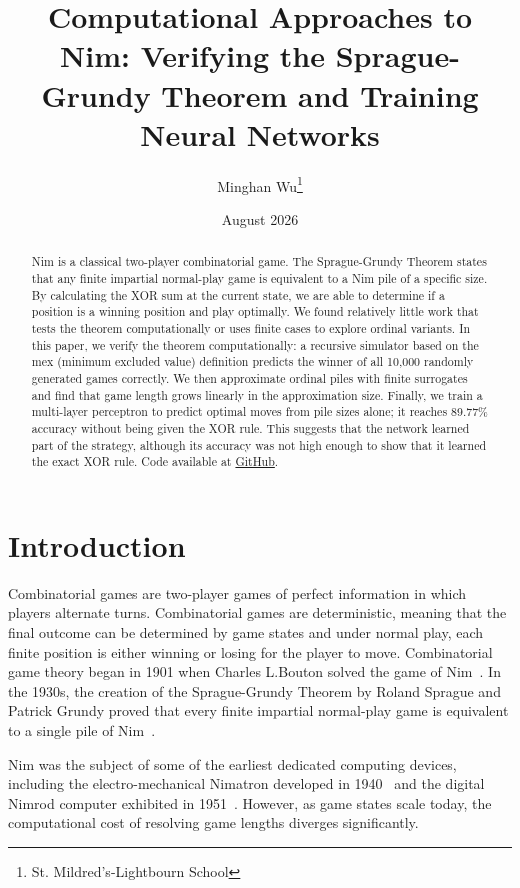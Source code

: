 \documentclass[11pt]{article}
\title{Computational Approaches to Nim: Verifying the Sprague-Grundy Theorem and Training Neural Networks}
\author{
Minghan Wu\thanks{St. Mildred's-Lightbourn School}
}
\date{August 2026}
\begin{document}
\maketitle

\begin{abstract}
Nim is a classical two-player combinatorial game. The Sprague-Grundy Theorem states that any finite impartial normal-play game is equivalent to a Nim pile of a specific size. By calculating the XOR sum at the current state, we are able to determine if a position is a winning position and play optimally. We found relatively little work that tests the theorem computationally or uses finite cases to explore ordinal variants. In this paper, we verify the theorem computationally: a recursive simulator based on the mex (minimum excluded value) definition predicts the winner of all 10,000 randomly generated games correctly. We then approximate ordinal piles with finite surrogates and find that game length grows linearly in the approximation size. Finally, we train a multi-layer perceptron to predict optimal moves from pile sizes alone; it reaches 89.77\% accuracy without being given the XOR rule. This suggests that the network learned part of the strategy, although its accuracy was not high enough to show that it learned the exact XOR rule. Code available at \href{https://github.com/Minghan-Wu/Nim-simulator}{GitHub}.
\end{abstract}

\section{Introduction}
Combinatorial games are two-player games of perfect information in which players alternate turns. Combinatorial games are deterministic, meaning that the final outcome can be determined by game states and under normal play, each finite position is either winning or losing for the player to move. Combinatorial game theory began in 1901 when Charles L.Bouton solved the game of Nim~\cite{bouton1901nim}. In the 1930s, the creation of the Sprague-Grundy Theorem by Roland Sprague and Patrick Grundy proved that every finite impartial normal-play game is equivalent to a single pile of Nim~\cite{sprague1935, grundy1939}. 

Nim was the subject of some of the earliest dedicated computing devices, including the electro-mechanical Nimatron developed in 1940~\cite{condon1940nimatron} and the digital Nimrod computer exhibited in 1951~\cite{norman1951nimrod}. However, as game states scale today, the computational cost of resolving game lengths diverges significantly.
\end{document}
